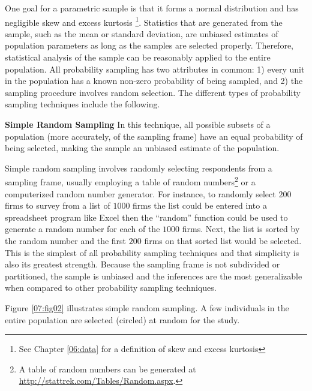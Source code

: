 One goal for a parametric sample is that it forms a normal distribution and has negligible skew and excess kurtosis \footnote{See Chapter \ref{06:data} for a definition of skew and excess kurtosis}. Statistics that are generated from the sample, such as the mean or standard deviation, are unbiased estimates of population parameters as long as the samples are selected properly. Therefore, statistical analysis of the sample can be reasonably applied to the entire population. All probability sampling has two attributes in common: 1) every unit in the population has a known non-zero probability of being sampled, and 2) the sampling procedure involves random selection. The different types of probability sampling techniques include the following.

\textbf{Simple Random Sampling} In this technique, all possible subsets of a population (more accurately, of the sampling frame) have an equal probability of being selected, making the sample an unbiased estimate of the population. 

Simple random sampling involves randomly selecting respondents from a sampling frame, usually employing a table of random numbers\footnote{A table of random numbers can be generated at \url{http://stattrek.com/Tables/Random.aspx}.} or a computerized random number generator. For instance, to randomly select $ 200 $ firms to survey from a list of $ 1000 $ firms the list could be entered into a spreadsheet program like Excel then the ``random'' function could be used to generate a random number for each of the $ 1000 $ firms. Next, the list is sorted by the random number and the first $ 200 $ firms on that sorted list would be selected. This is the simplest of all probability sampling techniques and that simplicity is also its greatest strength. Because the sampling frame is not subdivided or partitioned, the sample is unbiased and the inferences are the most generalizable when compared to other probability sampling techniques.

Figure \ref{07:fig02} illustrates simple random sampling. A few individuals in the entire population are selected (circled) at random for the study.

